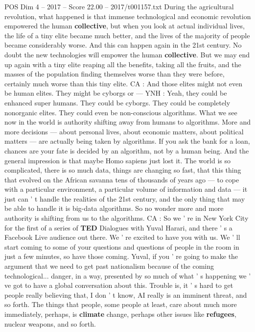 \begin{textsample}{POS Dim 4 – 2017 – Score 22.00 – 2017/t001157.txt}
During the agricultural revolution, what happened is that immense technological and economic revolution empowered the human \textbf{collective}, but when you look at actual individual lives, the life of a tiny elite became much better, and the lives of the majority of people became considerably worse.
And this can happen again in the 21st century.
No doubt the new technologies will empower the human \textbf{collective}.
But we may end up again with a tiny elite reaping all the benefits, taking all the fruits, and the masses of the population finding themselves worse than they were before, certainly much worse than this tiny elite.
CA : And those elites might not even be human elites.
They might be cyborgs or — YNH : Yeah, they could be enhanced super humans.
They could be cyborgs.
They could be completely nonorganic elites.
They could even be non-conscious algorithms.
What we see now in the world is authority shifting away from humans to algorithms.
More and more decisions — about personal lives, about economic matters, about political matters — are actually being taken by algorithms.
If you ask the bank for a loan, chances are your fate is decided by an algorithm, not by a human being.
And the general impression is that maybe Homo sapiens just lost it.
The world is so complicated, there is so much data, things are changing so fast, that this thing that evolved on the African savanna tens of thousands of years ago — to cope with a particular environment, a particular volume of information and data — it just can ' t handle the realities of the 21st century, and the only thing that may be able to handle it is big-data algorithms.
So no wonder more and more authority is shifting from us to the algorithms.
CA : So we ' re in New York City for the first of a series of \textbf{TED} Dialogues with Yuval Harari, and there ' s a Facebook Live audience out there.
We ' re excited to have you with us.
We ' ll start coming to some of your questions and questions of people in the room in just a few minutes, so have those coming.
Yuval, if you ' re going to make the argument that we need to get past nationalism because of the coming technological... danger, in a way, presented by so much of what ' s happening we ' ve got to have a global conversation about this.
Trouble is, it ' s hard to get people really believing that, I don ' t know, AI really is an imminent threat, and so forth.
The things that people, some people at least, care about much more immediately, perhaps, is \textbf{climate} change, perhaps other issues like \textbf{refugees}, nuclear weapons, and so forth.

\end{textsample}
